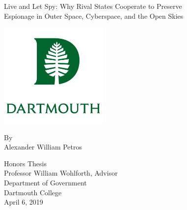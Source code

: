 
\begin{titlingpage}
\begin{center}
	\vspace*{0.5cm}
	\huge
	\SingleSpacing

	Live and Let Spy: Why Rival States Cooperate to Preserve\\
	Espionage in Outer Space, Cyberspace, and the Open Skies
	\vspace{1cm}

	\includegraphics[width=0.4\textwidth]{dartmouth-crest.jpg}

	\vspace{0.5cm}
	By\\
	Alexander William Petros



	\vfill
	\vspace{0.5cm}

	Honors Thesis\\
	Professor William Wohlforth, Advisor\\
	Department of Government\\
	Dartmouth College\\
	April 6, 2019

\end{center}
\end{titlingpage}
